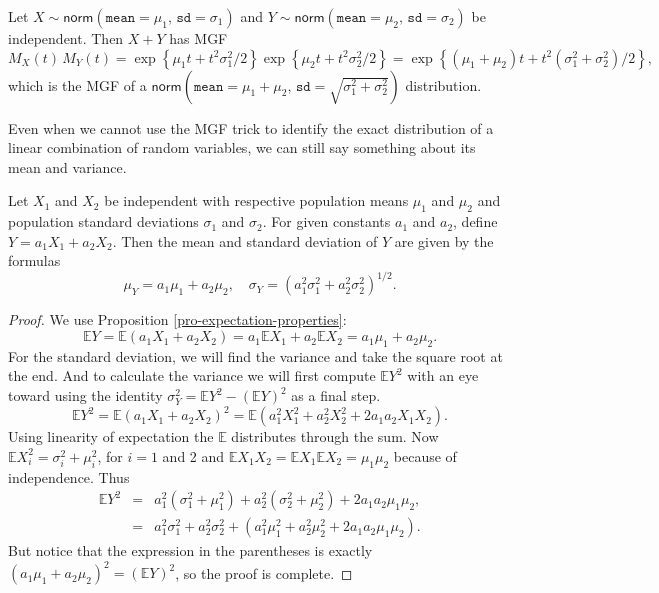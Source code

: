 \documentclass[captions=tableheading]{scrbook}
\begin{document}
\begin{example}
Let \(X\sim\mathsf{norm}(\mathtt{mean}=\mu_{1},\,\mathtt{sd}=\sigma_{1})\) and \(Y\sim\mathsf{norm}(\mathtt{mean}=\mu_{2},\,\mathtt{sd}=\sigma_{2})\) be independent. Then \(X+Y\) has MGF
\[
M_{X}(t)\, M_{Y}(t)=\exp\left\{ \mu_{1}t+t^{2}\sigma_{1}^{2}/2\right\} \exp\left\{ \mu_{2}t+t^{2}\sigma_{2}^{2}/2\right\} =\exp\left\{ \left(\mu_{1}+\mu_{2}\right)t+t^{2}\left(\sigma_{1}^{2}+\sigma_{2}^{2}\right)/2\right\} ,
\]
which is the MGF of a \(\mathsf{norm}\left(\mathtt{mean}=\mu_{1}+\mu_{2},\,\mathtt{sd}=\sqrt{\sigma_{1}^{2}+\sigma_{2}^{2}}\right)\) distribution. 
\end{example}

Even when we cannot use the MGF trick to identify the exact distribution of a linear combination of random variables, we can still say something about its mean and variance.

\begin{prop}
Let \(X_{1}\) and \(X_{2}\) be independent with respective population means \(\mu_{1}\) and \(\mu_{2}\) and population standard deviations \(\sigma_{1}\) and \(\sigma_{2}\). For given constants \(a_{1}\) and \(a_{2}\), define \(Y=a_{1}X_{1}+a_{2}X_{2}\). Then the mean and standard deviation of \(Y\) are given by the formulas
\begin{equation}
\mu_{Y}=a_{1}\mu_{1}+a_{2}\mu_{2},\quad \sigma_{Y}=\left(a_{1}^{2}\sigma_{1}^{2}+a_{2}^{2}\sigma_{2}^{2}\right)^{1/2}.
\end{equation}
\end{prop}

\begin{proof}
We use Proposition \ref{pro-expectation-properties}:
\[
\mathbb{E} Y=\mathbb{E}\left(a_{1}X_{1}+a_{2}X_{2}\right)=a_{1}\mathbb{E} X_{1}+a_{2}\mathbb{E} X_{2}=a_{1}\mu_{1}+a_{2}\mu_{2}.
\]
For the standard deviation, we will find the variance and take the square root at the end. And to calculate the variance we will first compute \(\mathbb{E} Y^{2}\) with an eye toward using the identity \(\sigma_{Y}^{2}=\mathbb{E} Y^{2}-\left(\mathbb{E} Y\right)^{2}\) as a final step. 
\[
\mathbb{E} Y^{2}=\mathbb{E}\left(a_{1}X_{1}+a_{2}X_{2}\right)^{2}=\mathbb{E}\left(a_{1}^{2}X_{1}^{2}+a_{2}^{2}X_{2}^{2}+2a_{1}a_{2}X_{1}X_{2}\right).
\]
Using linearity of expectation the \(\mathbb{E}\) distributes through the sum. Now \(\mathbb{E} X_{i}^{2}=\sigma_{i}^{2}+\mu_{i}^{2}\), for \(i=1\) and 2 and \(\mathbb{E} X_{1}X_{2}=\mathbb{E} X_{1}\mathbb{E} X_{2}=\mu_{1}\mu_{2}\) because of independence. Thus
\begin{eqnarray*}
\mathbb{E} Y^{2} & = & a_{1}^{2}(\sigma_{1}^{2}+\mu_{1}^{2})+a_{2}^{2}(\sigma_{2}^{2}+\mu_{2}^{2})+2a_{1}a_{2}\mu_{1}\mu_{2},\\
 & = & a_{1}^{2}\sigma_{1}^{2}+a_{2}^{2}\sigma_{2}^{2}+\left(a_{1}^{2}\mu_{1}^{2}+a_{2}^{2}\mu_{2}^{2}+2a_{1}a_{2}\mu_{1}\mu_{2}\right).
\end{eqnarray*}
But notice that the expression in the parentheses is exactly \(\left(a_{1}\mu_{1}+a_{2}\mu_{2}\right)^{2}=\left(\mathbb{E} Y\right)^{2}\), so the proof is complete.
\end{proof}
\end{document}
